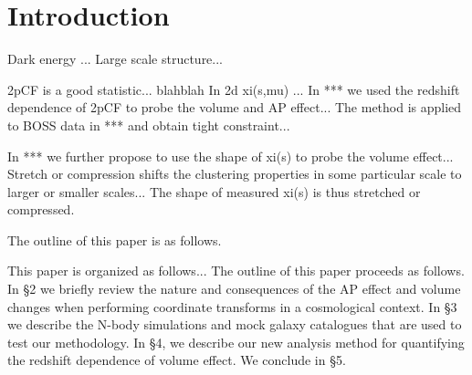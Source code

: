 \documentclass[iop]{emulateapj}
\begin{document}



\section{Introduction}

Dark energy ... Large scale structure...

2pCF is a good statistic... blahblah
In 2d xi(s,mu) ...
In *** we used the redshift dependence of 2pCF to probe the volume and AP effect...
The method is applied to BOSS data in *** and obtain tight constraint...

In *** we further propose to use the shape of xi(s) to probe the volume effect...
Stretch or compression shifts the clustering properties in some particular scale to larger or smaller scales...
The shape of measured xi(s) is thus stretched or compressed.

The outline of this paper is as follows. 

This paper is organized as follows...
The outline of this paper proceeds as follows. 
In \S 2 we briefly review the nature and consequences of the AP effect and volume changes when performing coordinate transforms in a cosmological context. 
In \S 3 we describe the N-body simulations and mock galaxy catalogues that are used to test our methodology.
In \S 4, we describe our new analysis method for quantifying the redshift dependence of volume effect.
We conclude in \S 5.
\end{document}
